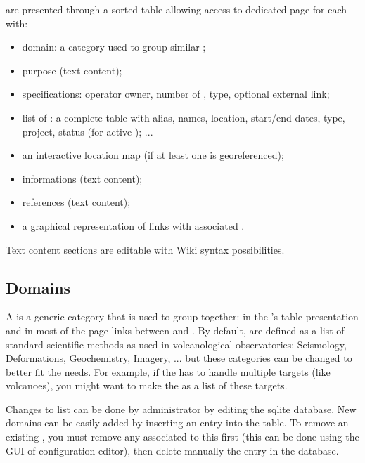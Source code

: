  are presented through a sorted table allowing access to dedicated page for each  with:
\begin{itemize}
\item    domain: a category used to group similar ;
\item    purpose (text content);
\item    specifications: operator owner, number of , type, optional external link;
\item    list of : a complete table with alias, names, location, start/end dates, type, project, status (for active ); ...
\item    an interactive location map (if at least one  is georeferenced);
\item    informations (text content);
\item    references (text content);
\item    a graphical representation of  links with associated .
\end{itemize}

Text content sections are editable with Wiki syntax possibilities.





\subsection{Domains}
\label{domains}

A  is a generic category that is used to group  together: in the 's table presentation and in most of the page links between  and . By default,  are defined as a list of standard scientific methods as used in volcanological observatories: Seismology, Deformations, Geochemistry, Imagery, ... but these categories can be changed to better fit the \webobs needs. For example, if the \webobs has to handle multiple targets (like volcanoes), you might want to make the  as a list of these targets.

Changes to  list can be done by administrator by editing the sqlite database. New domains can be easily added by inserting an entry into the  table. To remove an existing , you must remove any  associated to this  first (this can be done using the GUI of  configuration editor), then delete manually the entry in the database. 

